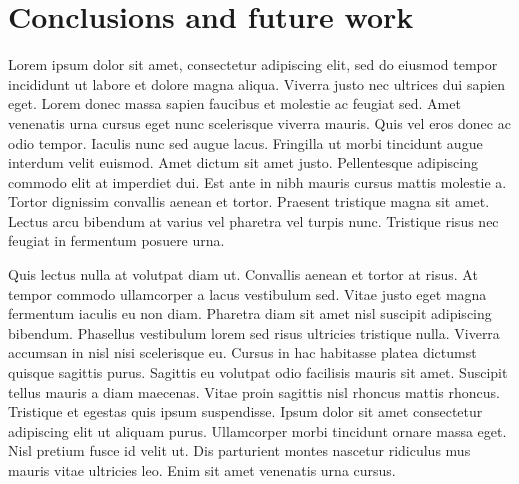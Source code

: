 \chapter{Conclusions and future work}\label{chapter:conclusion}

Lorem ipsum dolor sit amet, consectetur adipiscing elit, sed do eiusmod tempor incididunt ut labore et dolore magna aliqua. Viverra justo nec ultrices dui sapien eget. Lorem donec massa sapien faucibus et molestie ac feugiat sed. Amet venenatis urna cursus eget nunc scelerisque viverra mauris. Quis vel eros donec ac odio tempor. Iaculis nunc sed augue lacus. Fringilla ut morbi tincidunt augue interdum velit euismod. Amet dictum sit amet justo. Pellentesque adipiscing commodo elit at imperdiet dui. Est ante in nibh mauris cursus mattis molestie a. Tortor dignissim convallis aenean et tortor. Praesent tristique magna sit amet. Lectus arcu bibendum at varius vel pharetra vel turpis nunc. Tristique risus nec feugiat in fermentum posuere urna.

Quis lectus nulla at volutpat diam ut. Convallis aenean et tortor at risus. At tempor commodo ullamcorper a lacus vestibulum sed. Vitae justo eget magna fermentum iaculis eu non diam. Pharetra diam sit amet nisl suscipit adipiscing bibendum. Phasellus vestibulum lorem sed risus ultricies tristique nulla. Viverra accumsan in nisl nisi scelerisque eu. Cursus in hac habitasse platea dictumst quisque sagittis purus. Sagittis eu volutpat odio facilisis mauris sit amet. Suscipit tellus mauris a diam maecenas. Vitae proin sagittis nisl rhoncus mattis rhoncus. Tristique et egestas quis ipsum suspendisse. Ipsum dolor sit amet consectetur adipiscing elit ut aliquam purus. Ullamcorper morbi tincidunt ornare massa eget. Nisl pretium fusce id velit ut. Dis parturient montes nascetur ridiculus mus mauris vitae ultricies leo. Enim sit amet venenatis urna cursus.
